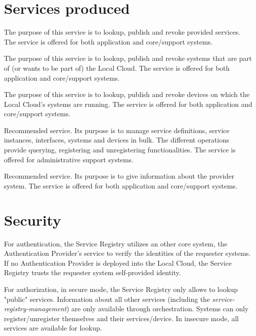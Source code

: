 \documentclass[a4paper]{arrowhead}
\begin{document}
\newpage

\section{Services produced}
\label{sec:services}

The purpose of this service is to lookup, publish and revoke provided services. The service is offered for both application and core/support systems. 

The purpose of this service is to lookup, publish and revoke systems that are part of (or wants to be part of) the Local Cloud. The service is offered for both application and core/support systems. 

The purpose of this service is to lookup, publish and revoke devices on which the Local Cloud's systems are running. The service is offered for both application and core/support systems. 

Recommended service.  Its purpose is to manage service definitions, service instances, interfaces, systems and devices in bulk. The different operations provide querying, registering and unregistering functionalities. The service is offered for administrative support systems. 

Recommended service. Its purpose is to give information about the provider system. The service is offered for both application and core/support systems.

\newpage

\section{Security}
\label{sec:security}

For authentication, the Service Registry utilizes an other core system, the Authentication Provider's service to verify the identities of the requester systems. If no Authentication Provider is deployed into the Local Cloud, the Service Registry trusts the requester system self-provided identity.

For authorization, in secure mode, the Service Registry only allows to lookup "public" services. Information about all other services (including the \textit{service-registry-management}) are only available through orchestration. Systems can only register/unregister themselves and their services/device. In insecure mode, all services are available for lookup.
\end{document}
